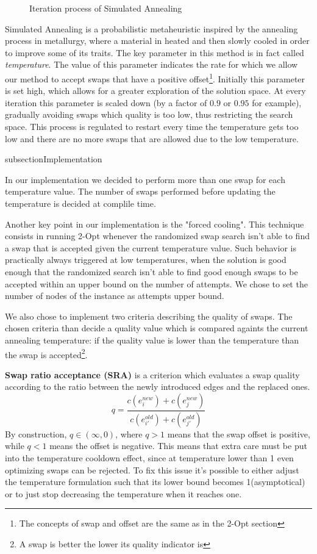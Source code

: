 \begin{figure}[htbp]
    \caption{Iteration process of Simulated Annealing}
    \label{fig:sa}
\end{figure}

Simulated Annealing is a probabilistic metaheuristic inspired by the annealing process in metallurgy, where a material in heated and then slowly cooled in order to improve some of its traits.
The key parameter in this method is in fact called \textit{temperature}.
The value of this parameter indicates the rate for which we allow our method to accept swaps that have a positive offset\footnote{The concepts of swap and offset are the same as in the 2-Opt section}.
Initially this parameter is set high, which allows for a greater exploration of the solution space.
At every iteration this parameter is scaled down (by a factor of $0.9$ or $0.95$ for example), gradually avoiding swaps which quality is too low, thus restricting the search space. 
This process is regulated to restart every time the temperature gets too low and there are no more swaps that are allowed due to the low temperature.

subsection{Implementation}

In our implementation we decided to perform more than one swap for each temperature value.
The number of swaps performed before updating the temperature is decided at complile time.

Another key point in our implementation is the "forced cooling".
This technique consists in running 2-Opt whenever the randomized swap search isn't able to find a swap that is accepted given the current temperature value.
Such behavior is practically always triggered at low temperatures, when the solution is good enough that the randomized search isn't able to find good enough swaps to be accepted within an upper bound on the number of attempts.
We chose to set the number of nodes of the instance as attempts upper bound.

We also chose to implement two criteria describing the quality of swaps.
The chosen criteria than decide a quality value which is compared againts the current annealing temperature: if the quality value is lower than the temperature than the swap is accepted\footnote{A swap is better the lower its quality indicator is}.

\textbf{Swap ratio acceptance (SRA)} is a criterion which evaluates a swap quality according to the ratio between the newly introduced edges and the replaced ones.
\[
    q = \frac{c(e^{new}_i) + c(e^{new}_j)}{c(e^{old}_{i'}) + c(e^{old}_{j'})}
\]
By construction, $q \in (\infty,0)$, where $q > 1$ means that the swap offset is positive, while $q < 1$ means the offset is negative.
This means that extra care must be put into the temperature cooldown effect, since at temperature lower than 1 even optimizing swaps can be rejected.
To fix this issue it's possible to either adjust the temperature formulation such that its lower bound becomes 1(asymptotical) or to just stop decreasing the temperature when it reaches one.
 
